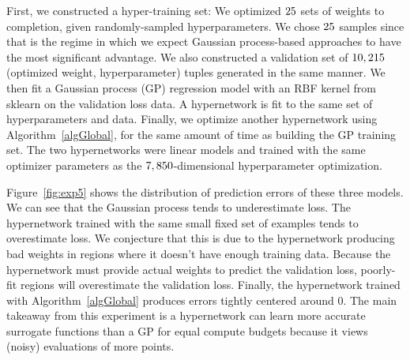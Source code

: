 \documentclass{article} %
\begin{document}
First, we constructed a hyper-training set: We optimized $25$ sets of weights to completion, given randomly-sampled hyperparameters.
We chose $25$ samples since that is the regime in which we expect Gaussian process-based approaches to have the most significant advantage.
We also constructed a validation set of $10,215$ (optimized weight, hyperparameter) tuples generated in the same manner.
{\color{red}We then fit a Gaussian process (GP)} regression model with an RBF kernel from sklearn on the validation loss data.
{\color{green}A hypernetwork is fit to the same set of hyperparameters and data}.
Finally, {\color{blue}we optimize another hypernetwork using Algorithm~\ref{algGlobal}}, for the same amount of time as building the GP training set.
The two hypernetworks were linear models and trained with the same optimizer parameters as the $7,850$-dimensional hyperparameter optimization.
%

Figure~\ref{fig:exp5} shows the distribution of prediction errors of these three models.
We can see that the Gaussian process tends to underestimate loss.
The hypernetwork trained with the same small fixed set of examples tends to overestimate loss.
We conjecture that this is due to the hypernetwork producing bad weights in regions where it doesn't have enough training data.
Because the hypernetwork must provide actual weights to predict the validation loss, poorly-fit regions will overestimate the validation loss.
Finally, the hypernetwork trained with Algorithm~\ref{algGlobal} produces errors tightly centered around 0.
The main takeaway from this experiment is a hypernetwork can learn more accurate surrogate functions than a GP for equal compute budgets because it views (noisy) evaluations of more points.
%

\end{document}
